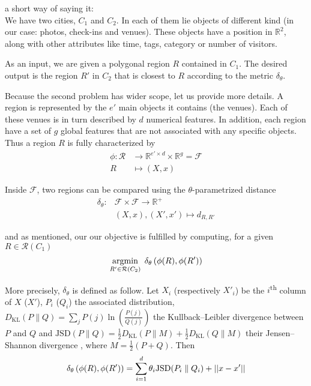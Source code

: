 \begin{comments}
a short way of saying it:\\
We have two cities, $C_1$ and $C_2$. In each of them lie objects of different
kind (in our case: photos, check-ins and venues). These objects have a
position in $\mathbb{R}^2$, along with other attributes like time, tags,
category or number of visitors.

As an input, we are given a polygonal region $R$ contained in $C_1$. The
desired output is the region $R'$ in $C_2$ that is closest to $R$ according
to the metric $\delta_{\theta}$.

\end{comments}

Because the second problem has wider scope, let us provide more details.
A region is represented by the $e'$ main objects it contains (the venues).
Each of these venues is in turn described by $d$ numerical features. In
addition, each region have a set of $g$ global features that are not
associated with any specific objects. Thus a region $R$ is fully characterized
by
\begin{align*}
	\phi \colon \mathcal{R} &\to
	\mathbb{R}^{e'\times d} \times \mathbb{R}^g = \mathcal{F} \\
	R &\mapsto (X, x)
\end{align*}

Inside $\mathcal{F}$, two regions can be compared using the
$\theta$-parametrized distance
\begin{align*}
	\delta_{\theta} \colon &\mathcal{F} \times \mathcal{F} \to
	\mathbb{R}^+ \\
	&(X, x) , (X', x') \mapsto d_{R,R'}
\end{align*}

and as mentioned, our our objective is fulfilled by computing, for a given $R
\in \mathcal{R}(C_1)$
\begin{equation}
	\operatorname*{argmin}_{R' \in \mathcal{R}(C_2)}\; \delta_{\theta}
	\left(\phi(R), \phi(R')\right)
	\label{e:onetheta}
\end{equation}

More precisely, $\delta_{\theta}$ is defined as follow. Let $X_i$ (respectively $X'_i$) be the $i$\textsuperscript{th} column
of $X$ ($X'$), $P_i$ ($Q_i$) the associated distribution, $D_{\mathrm{KL}}(P
\parallel Q) = \sum_j P(j)\ln\left(\frac{P(j)}{Q(j)}\right)$ the
Kullback--Leibler divergence between $P$ and $Q$ and $ \mathrm{JSD}(P
\parallel Q)= \frac{1}{2}D_{\mathrm{KL}}(P \parallel
M)+\frac{1}{2}D_{\mathrm{KL}}(Q \parallel M)$ their Jensen--Shannon divergence
\autocite{JensenShannon03}, where $M=\frac{1}{2}(P+Q)$. Then
\[
	\delta_{\theta} \left(\phi(R), \phi(R')\right) = \sum_{i=1}^d
	\theta_i \mathrm{JSD}(P_i \parallel Q_i) + \left|\left|x - x'\right|\right|
\]

